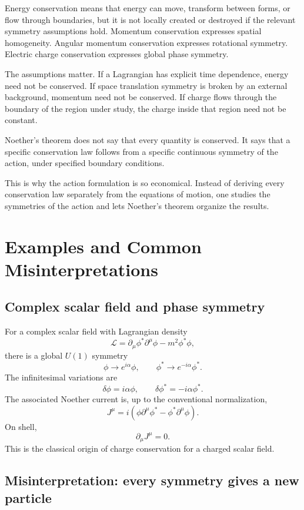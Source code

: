 Energy conservation means that energy can move, transform between forms, or flow
through boundaries, but it is not locally created or destroyed if the relevant
symmetry assumptions hold. Momentum conservation expresses spatial homogeneity.
Angular momentum conservation expresses rotational symmetry. Electric charge
conservation expresses global phase symmetry.

The assumptions matter. If a Lagrangian has explicit time dependence, energy
need not be conserved. If space translation symmetry is broken by an external
background, momentum need not be conserved. If charge flows through the boundary
of the region under study, the charge inside that region need not be constant.

\begin{remarkbox}
Noether's theorem does not say that every quantity is conserved. It says that a
specific conservation law follows from a specific continuous symmetry of the
action, under specified boundary conditions.
\end{remarkbox}

This is why the action formulation is so economical. Instead of deriving every
conservation law separately from the equations of motion, one studies the
symmetries of the action and lets Noether's theorem organize the results.

\section{Examples and Common Misinterpretations}

\subsection*{Complex scalar field and phase symmetry}

For a complex scalar field with Lagrangian density
\[
    \mathcal{L}=\partial_\mu\phi^*\partial^\mu\phi-m^2\phi^*\phi,
\]
there is a global \(U(1)\) symmetry
\[
    \phi\longrightarrow e^{i\alpha}\phi,
    \qquad
    \phi^*\longrightarrow e^{-i\alpha}\phi^*.
\]
The infinitesimal variations are
\[
    \delta\phi=i\alpha\phi,
    \qquad
    \delta\phi^*=-i\alpha\phi^*.
\]
The associated Noether current is, up to the conventional normalization,
\[
    J^\mu=i(\phi\partial^\mu\phi^*-\phi^*\partial^\mu\phi).
\]
On shell,
\[
    \partial_\mu J^\mu=0.
\]
This is the classical origin of charge conservation for a charged scalar field.

\subsection*{Misinterpretation: every symmetry gives a new particle}

